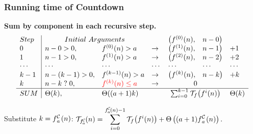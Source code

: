 \begin{frame}
\frametitle{Running time of Countdown}

\textbf{Sum by component in each recursive step.}
\begin{equation*}
\begin{array}{l|llllll}
Step & \multicolumn{2}{c}{Initial \ Arguments} &  & \big(f^{(0)}(n), & n - 0 \big) &  \\
0    & n - 0 > 0,     & f^{(0)}(n) > a & \to & \big(f^{(1)}(n), & n - 1\big) & + 1 \\
1    & n - 1 > 0, & f^{(1)}(n) > a & \to & \big(f^{(2)}(n), & n - 2\big) & + 2 \\
\cdots & \cdots & \cdots & \cdots & \cdots & \cdots & \cdots \\
k-1  & n - (k-1) > 0, & f^{(k-1)}(n) > a & \to & \big(f^{(k)}(n), & n - k\big) & + k \\
k & n - k \mathrel{?} 0, & {\color{red} f^{(k)}(n) \le a}  &\to & \multicolumn{2}{c}{0} &  \\ \hline
SUM & \Theta(k), & \Theta((a+1)k) & & \multicolumn{2}{c}{\sum_{i=0}^{k-1}\runtime_f\big(f^{i}(n)\big)} & \Theta(k)
\end{array}
\end{equation*}


Substitute $k = \cdt{f}{a}(n)$:
$\displaystyle
\runtime_{\cdt{f}{a}}(n) = \sum_{i=0}^{\cdt{f}{a}(n)-1}\runtime_f\big(f^{i}(n)\big)
+ \Theta\left((a+1)\cdt{f}{a}(n)\right).
$
\end{frame}



